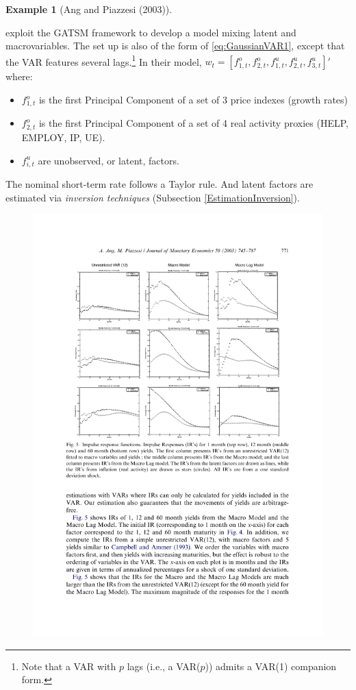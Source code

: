 \documentclass[
  12pt,
]{book}
\providecommand{\tightlist}{%
  \setlength{\itemsep}{0pt}\setlength{\parskip}{0pt}}
\theoremstyle{definition}
\theoremstyle{definition}
\newtheorem{example}{Example}[chapter]
\theoremstyle{definition}
\theoremstyle{definition}
\theoremstyle{remark}
\begin{document}
\begin{example}[Ang and Piazzesi (2003)]
\protect\hypertarget{exm:AngPiazzesi}{}\label{exm:AngPiazzesi}

\citet{Ang_Piazzesi_2003} exploit the GATSM framework to develop a model mixing latent and macrovariables. The set up is also of the form of \eqref{eq:GaussianVAR1}, except that the VAR features several lags.\footnote{Note that a VAR with \(p\) lags (i.e., a VAR(\(p\))) admits a VAR(1) companion form.} In their model, \(w_t = [f^{o}_{1,t},f^{o}_{2,t},f^{u}_{1,t},f^{u}_{2,t},f^{u}_{3,t}]'\) where:

\begin{itemize}
\tightlist
\item
  \(f^{o}_{1,t}\) is the first Principal Component of a set of 3 price indexes (growth rates)
\item
  \(f^{o}_{2,t}\) is the first Principal Component of a set of 4 real activity proxies (HELP, EMPLOY, IP, UE).
\item
  \(f^{u}_{i,t}\) are unobserved, or latent, factors.
\end{itemize}

The nominal short-term rate follows a Taylor rule. And latent factors are estimated via \emph{inversion techniques} (Subsection \ref{EstimationInversion}).

\begin{figure}

{\centering \includegraphics[width=0.95\linewidth]{figures/AngPiazzesi1} 

}
\end{figure}
\end{example}
\end{document}
